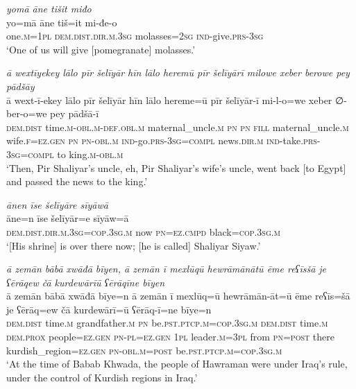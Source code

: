 \ea \label{ŽP.228}
\textit{yomā āne tišit miđo} \\ 
\gll yo=mā āne tiš=it mi-đe-o \\ 
 one\textsc{.m}\textsc{=1pl} \textsc{dem.dist}\textsc{.dir}\textsc{.m}\textsc{.3sg} molasses\textsc{=\textsc{2sg}} \textsc{ind-}give\textsc{.prs}\textsc{-3sg} \\ 
\glt `One of us will give [pomegranate] molasses.'
\z 
 
\ea \label{ŽP.258}
\textit{ā wextīyekey lālo pīr šelīyār hīn lālo heremū pīr šelīyārī milowe xeber berowe pey pādšāy} \\ 
\gll ā wext-ī-ekey lālo pīr šelīyār hīn lālo hereme=ū pīr šelīyār-ī mi-l-o=we xeber ∅-ber-o=we pey pādšā-ī \\ 
 \textsc{dem.dist} time\textsc{.m}\textsc{-obl}\textsc{.m}\textsc{-def}\textsc{.obl}\textsc{.m} maternal\_uncle\textsc{.m} \textsc{pn} \textsc{pn} \textsc{fill} maternal\_uncle\textsc{.m} wife\textsc{.f}\textsc{\textsc{=ez.gen}} \textsc{pn} \textsc{pn}\textsc{-obl}\textsc{.m} \textsc{ind-}go\textsc{.prs}\textsc{-3sg}\textsc{=compl} news\textsc{.dir}\textsc{.m} \textsc{ind-}take\textsc{.prs}\textsc{-3sg}\textsc{=compl} to king\textsc{.m}\textsc{-obl}\textsc{.m} \\ 
\glt `Then, Pir Shaliyar’s uncle, eh, Pir Shaliyar’s wife’s uncle, went back [to Egypt] and passed the news to the king.'
\z 
 
\ea \label{ŽP.267}
\textit{ānen īse šelīyāre sīyāwā} \\ 
\gll āne=n īse šelīyār=e sīyāw=ā \\ 
 \textsc{dem.dist}\textsc{.dir}\textsc{.m}\textsc{.3sg}\textsc{=cop}\textsc{.3sg}\textsc{.m} now \textsc{pn}\textsc{=ez}\textsc{.cmpd} black\textsc{=cop}\textsc{.3sg}\textsc{.m} \\ 
\glt `[His shrine] is over there now; [he is called] Shaliyar Siyaw.'
\z 
 
\ea \label{BP.9}
\textit{ā zemān bābā xwāđā bīyen, ā zemān ī mexlūqū hewrāmānātū ēme reʕīsšā je ʕērāqew čā kurdewārīū ʕērāqīne bīyen} \\ 
\gll ā zemān bābā xwāđā bīye=n ā zemān ī mexlūq=ū hewrāmān-āt=ū ēme reʕīs=šā je ʕērāq=ew čā kurdewārī=ū ʕērāq-ī=ne bīye=n \\ 
 \textsc{dem.dist} time\textsc{.m} grandfather\textsc{.m} \textsc{pn} be\textsc{.pst}\textsc{.ptcp}\textsc{.m}\textsc{=cop}\textsc{.3sg}\textsc{.m} \textsc{dem.dist} time\textsc{.m} \textsc{dem.prox} people\textsc{=ez.gen} \textsc{pn}\textsc{\textsc{-pl}}\textsc{=ez.gen} \textsc{1pl} leader\textsc{.m}\textsc{=3pl} from \textsc{pn}\textsc{=\textsc{post}} there kurdish\_region\textsc{=ez.gen} \textsc{pn}\textsc{-obl}\textsc{.m}\textsc{=\textsc{post}} be\textsc{.pst}\textsc{.ptcp}\textsc{.m}\textsc{=cop}\textsc{.3sg}\textsc{.m} \\ 
\glt `At the time of Babab Khwada, the people of Hawraman were under Iraq’s rule, under the control of Kurdish regions in Iraq.'
\z 
 
